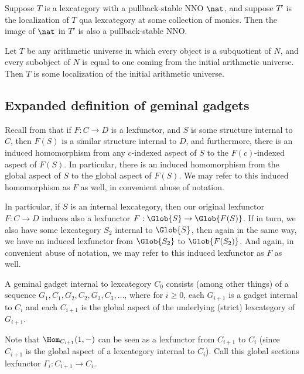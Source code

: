 \begin{lemma}
Suppose $T$ is a lexcategory with a pullback-stable NNO $\nat$, and suppose $T'$ is the localization of $T$ qua lexcategory at some collection of monics. Then the image of $\nat$ in $T'$ is also a pullback-stable NNO. 
\end{lemma}

\begin{lemma}
Let $T$ be any arithmetic universe in which every object is a subquotient of $N$, and every subobject of $N$ is equal to one coming from the initial arithmetic universe. Then $T$ is some localization of the initial arithmetic universe.
\end{lemma}

\subsection{Expanded definition of geminal gadgets}
Recall from  that if $F : C \to D$ is a lexfunctor, and $S$ is some structure internal to $C$, then $F(S)$ is a similar structure internal to $D$, and furthermore, there is an induced homomorphism from any $c$-indexed aspect of $S$ to the $F(c)$-indexed aspect of $F(S)$. In particular, there is an induced homomorphism from the global aspect of $S$ to the global aspect of $F(S)$. We may refer to this induced homomorphism as $F$ as well, in convenient abuse of notation.

In particular, if $S$ is an internal lexcategory, then our original lexfunctor $F : C \to D$ induces also a lexfunctor $F : \Glob{S} \to \Glob{F(S)}$. If in turn, we also have some lexcategory $S_2$ internal to $\Glob{S}$, then again in the same way, we have an induced lexfunctor from $\Glob{S_2}$ to $\Glob{F(S_2)}$. And again, in convenient abuse of notation, we may refer to this induced lexfunctor as $F$ as well.

A geminal gadget internal to lexcategory $C_0$ consists (among other things) of a sequence $G_1, C_1, G_2, C_2, G_3, C_3, \ldots$, where for $i \geq 0$, each $G_{i + 1}$ is a gadget internal to $C_i$ and each $C_{i + 1}$ is the global aspect of the underlying (strict) lexcategory of $G_{i + 1}$.

Note that $\Hom_{C_{i + 1}}(1, -)$ can be seen as a lexfunctor from $C_{i + 1}$ to $C_i$ (since $C_{i + 1}$ is the global aspect of a lexcategory internal to $C_i$). Call this global sections lexfunctor $\Gamma_i : C_{i + 1} \to C_i$.

